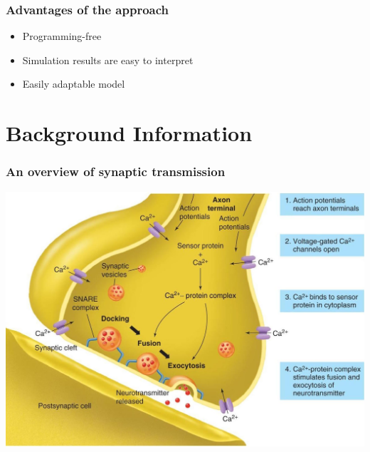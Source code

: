 \documentclass{beamer}
\begin{document}
\frame
{
    \frametitle{Advantages of the approach}
    \begin{itemize}
        \item<1-> Programming-free
        \item<2-> Simulation results are easy to interpret
        \item<3-> Easily adaptable model
    \end{itemize}
}
\section{Background Information}

\frame
{
    \frametitle{An overview of synaptic transmission}
    \includegraphics[width=1\textwidth]{fig1.jpg}
}
\end{document}

